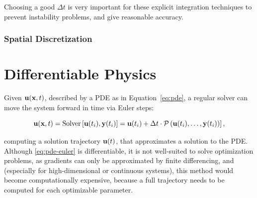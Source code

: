 Choosing a good $\Delta t$ is very important for these explicit integration
techniques to prevent instability problems, and give reasonable accuracy. 

\subsubsection*{Spatial Discretization}

\section{Differentiable Physics}
Given $\vb{u}(\vb{x}, t)$, described by a \ac{PDE} as in Equation~\eqref{eq:pde}, a regular
solver can move the system forward in time via Euler steps:

\begin{equation}
\vb{u}(\vb{x},t) = \text{Solver}\left[ \vb{u}(t_i), \vb{y}(t_i)] = 
  \vb{u}(t_i) + \Delta t \cdot \mathcal{P} \left( 
    \vb{u}(t_i), \dots, \vb{y}(t_i)
  \right)
\right],
\label{eq:pde-euler}
\end{equation}

computing a solution trajectory $\vb{u}(t)$, that approximates a solution to the
\ac{PDE}. Although \eqref{eq:pde-euler} is differentiable, it is not well-suited
to solve optimization problems, as gradients can only be approximated by finite
differencing, and (especially for high-dimensional or continuous systems), this
method would become computationally expensive, because a full trajectory needs
to be computed for each optimizable parameter.

